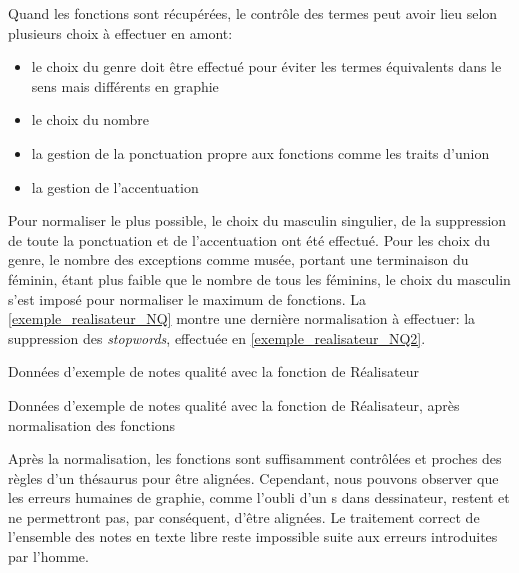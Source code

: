 Quand les fonctions sont récupérées, le contrôle des termes peut avoir lieu selon plusieurs choix à effectuer en amont:
\begin{itemize}
	\item le choix du genre doit être effectué pour éviter les termes équivalents dans le sens mais différents en graphie
	\item le choix du nombre
	\item la gestion de la ponctuation propre aux fonctions comme les traits d'union
	\item la gestion de l'accentuation
\end{itemize}
Pour normaliser le plus possible, le choix du masculin singulier, de la suppression de toute la ponctuation et de l'accentuation ont été effectué. Pour les choix du genre, le nombre des exceptions comme \og musée\fg{}, portant une terminaison du féminin, étant plus faible que le nombre de tous les féminins, le choix du masculin s'est imposé pour normaliser le maximum de fonctions. La \autoref{exemple_realisateur_NQ} montre une dernière normalisation à effectuer: la suppression des \textit{stopwords}, effectuée en \autoref{exemple_realisateur_NQ2}.
\begin{table}[!h]
	\centering
	\caption{Données d'exemple de notes qualité avec la fonction de Réalisateur}
	\label{exemple_realisateur_NQ}
\end{table}
\begin{table}[!h]
	\centering
	\caption{Données d'exemple de notes qualité avec la fonction de Réalisateur, après normalisation des fonctions}
	\label{exemple_realisateur_NQ2}
\end{table}
\bigskip

Après la normalisation, les fonctions sont suffisamment contrôlées et proches des règles d'un thésaurus pour être alignées. Cependant, nous pouvons observer que les erreurs humaines de graphie, comme l'oubli d'un \og s\fg{} dans \og dessinateur\fg{}, restent et ne permettront pas, par conséquent, d'être alignées. Le traitement correct de l'ensemble des notes en texte libre reste impossible suite aux erreurs introduites par l'homme.\\

